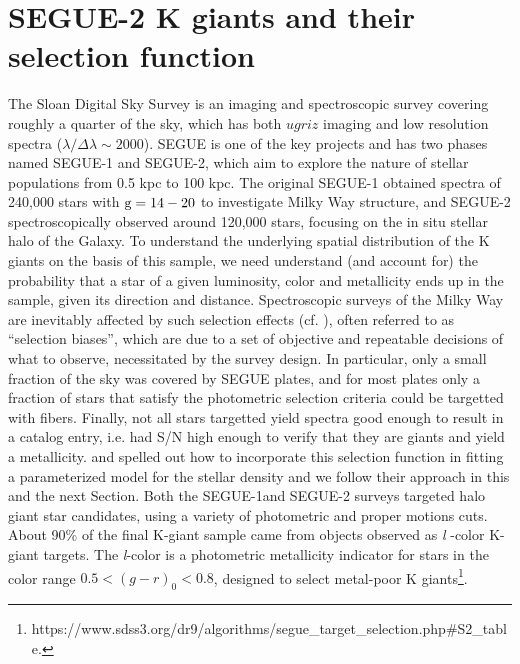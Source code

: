 \documentclass[12pt,preprint]{aastex}
\begin{document}
\section{SEGUE-2 K giants and their selection function}\label{sec:Sample_and_SelectionFunction}
The Sloan Digital Sky Survey\citep[SDSS;][]{York2000} is an imaging and spectroscopic survey covering roughly a quarter of the sky, which has both $ugriz$ imaging \citep{Fukugita1996, Gunn1998, Stoughton2002, Pier2003, Eisenstein2011} and low resolution spectra ($\lambda/\Delta \lambda \sim 2000$). SEGUE is one of
the key projects and has two phases named SEGUE-1 and SEGUE-2, which aim to explore the nature of stellar populations from 0.5 kpc to 100 kpc\citep[][and Rockosi et al. in prep.]{Yanny2009b}. The original SEGUE-1 obtained spectra of 240,000 stars with $\rm g=14-20$ to investigate Milky Way structure, and SEGUE-2 spectroscopically observed around 120,000 stars, focusing on the in situ stellar halo of the Galaxy.
To understand the underlying spatial distribution of the K giants on the basis of this sample, we need understand (and account for) the probability that a star of a given luminosity, color and metallicity ends up in the sample, given its direction and distance.
Spectroscopic surveys of the Milky Way are inevitably affected by such selection effects (cf. \citet{Rix2013}),
often referred to as ``selection biases'', which are due to a set of objective and repeatable decisions of what to observe,
necessitated by the survey design. In particular, only a small fraction of the sky was covered by SEGUE plates,
and for most plates only a fraction of stars that satisfy the photometric selection criteria could be targetted with fibers. Finally, not all stars targetted yield spectra good enough to result in a catalog entry, i.e. had S/N high enough to
verify that they are giants and yield a metallicity. \citet{Bovy2012} and \citet{Rix2013} spelled out how to incorporate this selection function in fitting a parameterized model for the stellar density and we follow their approach in this and the next Section.
Both the SEGUE-1and SEGUE-2 surveys targeted halo giant star candidates, using a variety of photometric and proper motions cuts. About 90\% of the final K-giant sample came from objects observed as \textit{l} -color K-giant targets.
The \textit{l}-color is a photometric metallicity indicator for stars in the color range $0.5 < (g-r)_0 < 0.8$, designed to select metal-poor K giants\footnote{https://www.sdss3.org/dr9/algorithms/segue\_target\_selection.php\#S2\_table.}.
\end{document}
